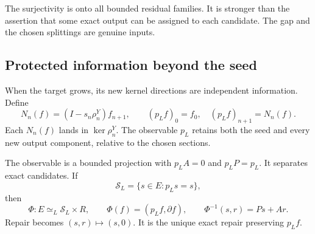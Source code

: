 The surjectivity is onto all bounded residual families. It is stronger than the assertion that some exact output can be assigned to each candidate. The gap and the chosen splittings are genuine inputs.

\subsection{Protected information beyond the seed}
When the target grows, its new kernel directions are independent information. Define
\[
 N_n(f)=(I-s_n\rho^Y_n)f_{n+1},\qquad
 (p_Lf)_0=f_0,\quad(p_Lf)_{n+1}=N_n(f).
\]
Each \(N_n(f)\) lands in \(\ker\rho^Y_n\). The observable \(p_L\) retains both the seed and every new output component, relative to the chosen sections.

\begin{KStheorem}\label{KS:KS21}
The observable is a bounded projection with \(p_LA=0\) and \(p_LP=p_L\). It separates exact candidates. If
\[
 \mathcal S_L=\{s\in E:p_Ls=s\},
\]
then
\[
 \Phi:E\simeq_L\mathcal S_L\times R,
 \qquad \Phi(f)=(p_Lf,\partial f),
 \qquad \Phi^{-1}(s,r)=Ps+Ar.
\]
Repair becomes \((s,r)\mapsto(s,0)\). It is the unique exact repair preserving \(p_Lf\).
\end{KStheorem}

